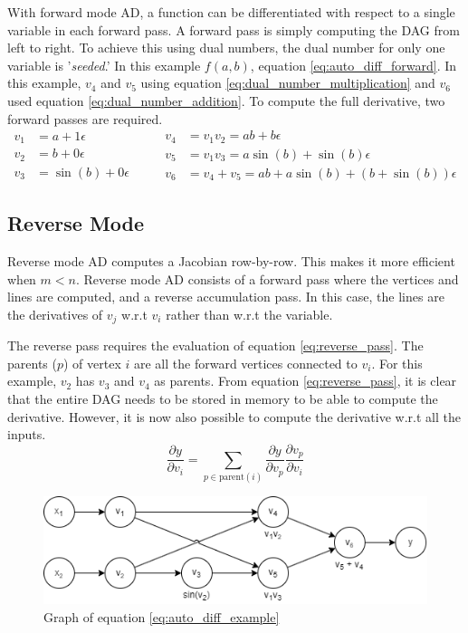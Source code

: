 With forward mode AD, a function can be differentiated with respect to a single variable in each forward pass. A forward pass is simply computing the DAG from left to right. To achieve this using dual numbers, the dual number for only one variable is '\emph{seeded}.' In this example $f(a,b)$, equation \ref{eq:auto_diff_forward}. In this example, $v_4$ and $v_5$ using equation \ref{eq:dual_number_multiplication} and $v_6$ used equation \ref{eq:dual_number_addition}. To compute the full derivative, two forward passes are required.
\begin{equation}
	\begin{split}
		v_1 &= a+1\epsilon \\
		v_2 &= b+0\epsilon \\
		v_3 &= \sin(b)+0\epsilon
	\end{split} \qquad
	\begin{split}
		v_4 &= v_1v_2=ab+b\epsilon \\
		v_5 &= v_1v_3 = a\sin(b) + \sin(b)\epsilon \\
		v_6 &= v_4 + v_5 = ab+a\sin(b) + (b + \sin(b))\epsilon 
	\end{split}
	\label{eq:auto_diff_forward}
\end{equation}

\subsection*{Reverse Mode}
Reverse mode AD computes a Jacobian row-by-row. This makes it more efficient when $m < n$. Reverse mode AD consists of a forward pass where the vertices and lines are computed, and a reverse accumulation pass. In this case, the lines are the derivatives of $v_j$ w.r.t $v_i$ rather than w.r.t the variable. 

The reverse pass requires the evaluation of equation \ref{eq:reverse_pass}. The parents ($p$) of vertex $i$ are all the forward vertices connected to $v_i$. For this example, $v_2$ has $v_3$ and $v_4$ as parents. From equation \ref{eq:reverse_pass}, it is clear that the entire DAG needs to be stored in memory to be able to compute the derivative. However, it is now also possible to compute the derivative w.r.t all the inputs. 
\begin{equation}
	\frac{\partial y}{\partial v_i}=\sum_{p\in \text{parent}(i)}\frac{\partial y}{\partial v_p}\frac{\partial v_p}{\partial v_i}
	\label{eq:reverse_pass}
\end{equation}


\begin{figure}[b]
	\centering
	\includegraphics[width=0.75\linewidth]{figures/chapter_2/AutomaticDifferentiation.png}
	\caption{Graph of equation \ref{eq:auto_diff_example}}
	\label{fig:auto_diff_example_dag}
\end{figure}